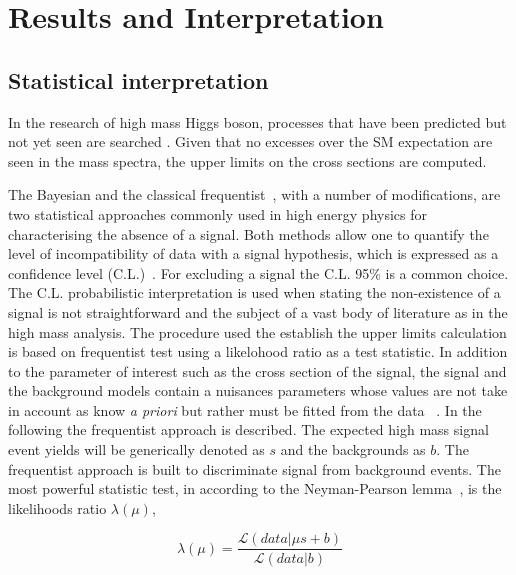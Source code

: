 \chapter{Results and Interpretation}

\section{Statistical interpretation}
In the research of high mass Higgs boson, processes that have been predicted but not yet seen are searched . Given that no excesses over the SM expectation are seen in the mass spectra, the  upper limits on the cross sections are computed.

The Bayesian and the classical frequentist~\cite{cowan1998statistical}, with a number of modifications, are two statistical approaches commonly used in high energy physics for characterising the absence
of a signal.
Both methods allow one to quantify the level of incompatibility of data with a signal
hypothesis,  which  is  expressed  as  a  confidence  level  (C.L.)~\cite{CMS-NOTE-2011-005}. For excluding a signal the C.L. 95\% is a common choice.
The C.L. probabilistic interpretation is used when stating the non-existence
of a signal is not straightforward and the subject of a vast body of literature as in the high mass analysis.
The procedure used the establish the upper limits calculation is based on frequentist test using  a likelohood ratio as a test statistic. In addition to the parameter of interest such as the cross section of the signal, the signal and the background models contain a nuisances parameters whose values are not take in account as know \textit{a priori} but rather must be fitted from the data ~\cite{Cowan:2010js}.
In the following the frequentist approach is described.  The expected high mass signal  event yields will be generically denoted as $s$ and the backgrounds as $b$.
\newline
The  frequentist approach is built  to discriminate signal from background events. The most powerful statistic test, in according to the Neyman-Pearson lemma~\cite{cowan1998statistical}, is the likelihoods ratio $\lambda (\mu)$, 

\begin{equation}
  \lambda (\mu)=\frac{\mathcal{L}(data | \mu s +b)  }{ \mathcal{L}(data | b) }  \end{equation}

